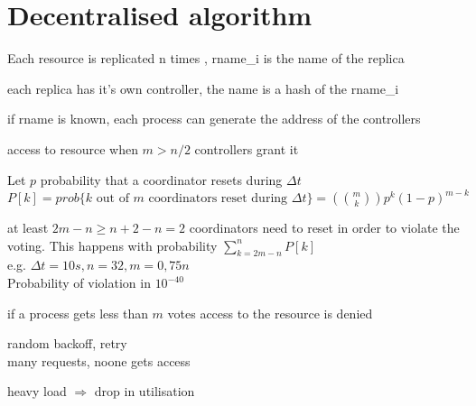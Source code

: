 \documentclass[ngerman,a4paper]{report}
\begin{document}
\section{Decentralised algorithm}
\begin{compactitem}
	\item Each resource is replicated n times , rname\_i is the name of the replica\\
	\item each replica has it's own controller, the name is a hash of the rname\_i
	\item if rname is known, each process can generate the address of the controllers				
	\item access to resource when $m>n/2$ controllers grant it
	\item Let $p$ probability that a coordinator resets during $\Delta t$\\
		$P[k]= prob\lbrace k \text{ out of } m \text{ coordinators reset during } \Delta t\rbrace = \left( \binom{m}{k}\right) p^k (1-p)^{m-k}$
	\item at least $2m-n\geq n+2-n=2$ coordinators need to reset in order to violate the voting. This happens with probability $\sum\limits_{k=2m-n}^n P[k]$\\
		e.g. $\Delta t = 10s, n=32, m=0,75n$\\
		Probability of violation in $10^{-40}$
	\item if a process gets less than $m$ votes access to the resource is denied
	\item random backoff, retry\\
		many requests, noone gets access
	\item heavy load $\Rightarrow$ drop in utilisation
\end{compactitem}
\end{document}
